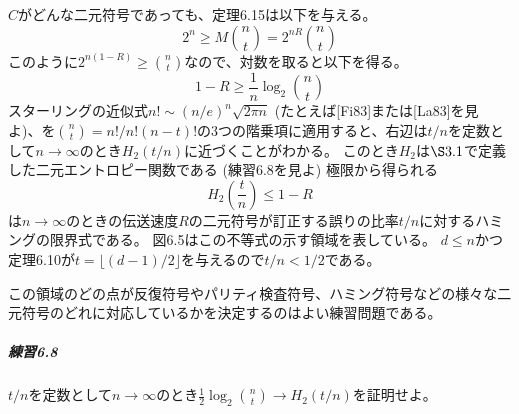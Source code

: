\documentclass[12pt,a4paper]{article}
\begin{document}
    $C$がどんな二元符号であっても、定理6.15は以下を与える。
    \[ 2^n \geq M \binom{n}{t} = 2^{nR} \binom{n}{t} \]
    このように$2^{n(1-R)} \geq \binom{n}{t}$なので、対数を取ると以下を得る。
    \[ 1 - R \geq \frac{1}{n} \log_2 \binom{n}{t} \]
    スターリングの近似式$n! \sim {(n/e)}^n \sqrt{2 \pi n}$ (たとえば[Fi83]または[La83]を見よ)、を$\binom{n}{t} = n! / n! (n - t)! $の3つの階乗項に適用すると、右辺は$t/n$を定数として$n \rightarrow \infty$のとき$H_2 (t/n)$に近づくことがわかる。
    このとき$H_2$は$\S 3.1$で定義した二元エントロピー関数である (練習6.8を見よ)
    極限から得られる
    \[ H_2(\frac{t}{n}) \leq 1 - R \]
    は$n \rightarrow \infty$のときの伝送速度$R$の二元符号が訂正する誤りの比率$t/n$に対するハミングの限界式である。
    図6.5はこの不等式の示す領域を表している。
    $d \leq n$かつ定理6.10が$t = \lfloor (d - 1) / 2 \rfloor $を与えるので$t/n < 1/2$である。

    この領域のどの点が反復符号やパリティ検査符号、ハミング符号などの様々な二元符号のどれに対応しているかを決定するのはよい練習問題である。

      \subparagraph{練習6.8}
        $t/n$を定数として$n \rightarrow \infty$のとき$\frac{1}{2} \log_2 \binom{n}{t} \rightarrow H_2(t/n)$を証明せよ。
\end{document}
